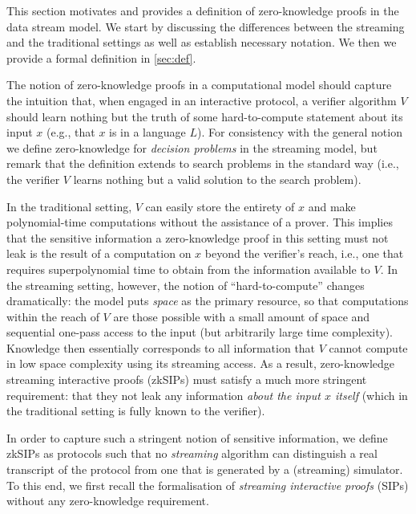 \documentclass[10pt,a4paper]{article}
\theoremstyle{definition}
\newcommand{\zksip}{\textrm{zkSIP}}
\begin{document}
    This section motivates and provides a definition of zero-knowledge proofs in the data stream model. We start by discussing the differences between the streaming and the traditional settings as well as establish necessary notation. We then we provide a formal definition in \cref{sec:def}.
    
    The notion of zero-knowledge proofs in a computational model should capture the intuition that, when engaged in an interactive protocol, a verifier algorithm $V$ should learn nothing but the truth of some hard-to-compute statement about its input $x$ (e.g., that $x$ is in a language $L$). For consistency with the general notion we define zero-knowledge for \emph{decision problems} in the streaming model, but remark that the definition extends to search problems in the standard way (i.e., the verifier $V$ learns nothing but a valid solution to the search problem).
    
    In the traditional setting, $V$ can easily store the entirety of $x$ and make polynomial-time computations without the assistance of a prover. This implies that the sensitive information a zero-knowledge proof in this setting must not leak is the result of a computation on $x$ beyond the verifier's reach, i.e., one that requires superpolynomial time to obtain from the information available to $V$. In the streaming setting, however, the notion of ``hard-to-compute'' changes dramatically: the model puts \emph{space} as the primary resource, so that computations within the reach of $V$ are those possible with a small amount of space and sequential one-pass access to the input (but arbitrarily large time complexity). Knowledge then essentially corresponds to all information that $V$ cannot compute in low space complexity using its streaming access. As a result, zero-knowledge streaming interactive proofs (\zksip{}s) must satisfy a much more stringent requirement: that they not leak any information \emph{about the input $x$ itself} (which in the traditional setting is fully known to the verifier).
    
    In order to capture such a stringent notion of sensitive information, we define \zksip{}s as protocols such that no \emph{streaming} algorithm can distinguish a real transcript of the protocol from one that is generated by a (streaming) simulator. To this end, we first recall the formalisation of \emph{streaming interactive proofs} (SIPs) \cite{CTY11} without any zero-knowledge requirement.
\end{document}
